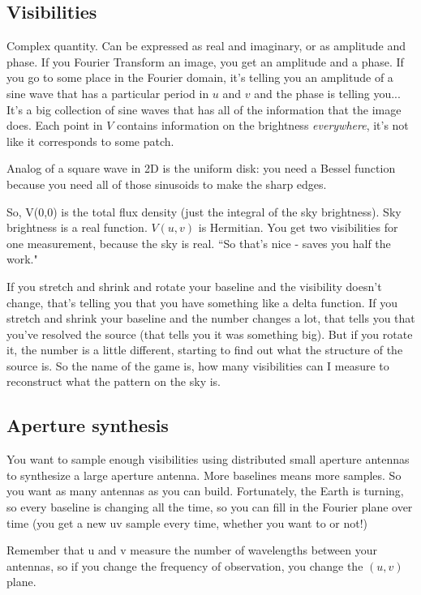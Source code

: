 \documentclass[a4paper]{article}
\begin{document}
\subsection{Visibilities}

Complex quantity. Can be expressed as real and imaginary, or as amplitude and phase. If you Fourier Transform an image, you get an amplitude and a phase. If you go to some place in the Fourier domain, it's telling you an amplitude of a sine wave that has a particular period in $u$ and $v$ and the phase is telling you... It's a big collection of sine waves that has all of the information that the image does. Each point in $V$ contains information on the brightness \emph{everywhere}, it's not like it corresponds to some patch.

Analog of a square wave in 2D is the uniform disk: you need a Bessel function because you need all of those sinusoids to make the sharp edges.

So, V(0,0) is the total flux density (just the integral of the sky brightness). Sky brightness is a real function. $V(u,v)$ is Hermitian. You get two visibilities for one measurement, because the sky is real. ``So that's nice - saves you half the work."

If you stretch and shrink and rotate your baseline and the visibility doesn't change, that's telling you that you have something like a delta function. If you stretch and shrink your baseline and the number changes a lot, that tells you that you've resolved the source (that tells you it was something big). But if you rotate it, the number is a little different, starting to find out what the structure of the source is. So the name of the game is, how many visibilities can I measure to reconstruct what the pattern on the sky is.

\subsection{Aperture synthesis}

You want to sample enough visibilities using distributed small aperture antennas to synthesize a large aperture antenna. More baselines means more samples. So you want as many antennas as you can build. Fortunately, the Earth is turning, so every baseline is changing all the time, so you can fill in the Fourier plane over time (you get a new uv sample every time, whether you want to or not!) 

Remember that u and v measure the number of wavelengths between your antennas, so if you change the frequency of observation, you change the $(u,v)$ plane. 
\end{document}
